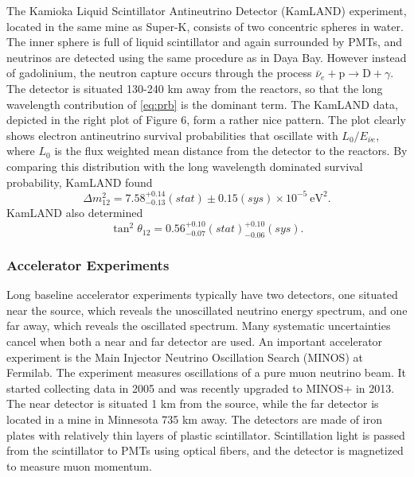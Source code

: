 The Kamioka Liquid Scintillator Antineutrino Detector (KamLAND) experiment,
located in the same mine as Super-K, consists of two concentric spheres in
water. The inner sphere is full of liquid scintillator and again surrounded by
PMTs, and neutrinos are detected using the same procedure as in Daya Bay.
However instead of gadolinium, the neutron capture occurs through the
process $\bar{\nu}_e+\text{p}\to\text{D}+\gamma$. The detector is situated
130-240 km away from the reactors, so that the long wavelength contribution of
\eqref{eq:prb} is the dominant term. The KamLAND data, depicted in the right
plot of Figure 6, form a rather nice pattern. The plot clearly shows electron
antineutrino survival probabilities that oscillate with $L_0/E_{\bar{\nu}e}$,
where $L_0$ is the flux weighted mean distance from the detector to the
reactors. By comparing this distribution with the long wavelength dominated
survival probability, KamLAND found \cite{K1}
\begin{equation}
  \Delta m_{12}^2=7.58^{+0.14}_{-0.13}(stat)
        \pm0.15(sys)\times10^{-5}~\text{eV}^2.
\end{equation}
KamLAND also determined
\begin{equation}
  \tan^2\theta_{12}=0.56^{+0.10}_{-0.07}(stat)^{+0.10}_{-0.06}(sys).
\end{equation}

\subsubsection{Accelerator Experiments}
Long baseline accelerator experiments typically have two detectors, one
situated near the source, which reveals the unoscillated neutrino energy
spectrum, and one far away, which reveals the oscillated spectrum.
Many systematic uncertainties cancel when both a near and far detector are
used.
An important accelerator experiment is the Main Injector Neutrino Oscillation
Search (MINOS) at Fermilab. The experiment measures oscillations
of a pure muon neutrino beam. It started collecting data in 2005 and
was recently upgraded to MINOS+ in 2013. The near detector is situated 1 km
from the source, while the far detector is located in a mine in Minnesota
735 km away. The detectors are made of iron plates with relatively
thin layers of
plastic scintillator. Scintillation light is passed from the scintillator to
PMTs using optical fibers, and the detector is magnetized to measure
muon momentum.

